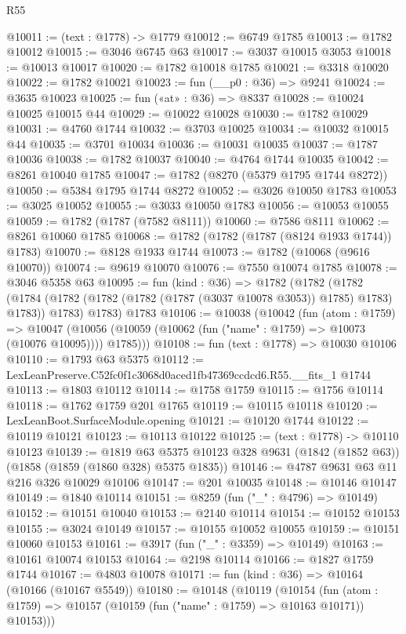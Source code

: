 \begin{lexlean}{R55}
\begin{coremodule}
@10011 := (text : @1778) -> @1779
@10012 := @6749 @1785
@10013 := @1782 @10012
@10015 := @3046 @6745 @63
@10017 := @3037 @10015 @3053
@10018 := @10013 @10017
@10020 := @1782 @10018 @1785
@10021 := @3318 @10020
@10022 := @1782 @10021
@10023 := fun (__p0 : @36) => @9241
@10024 := @3635 @10023
@10025 := fun («at» : @36) => @8337
@10028 := @10024 @10025 @10015 @44
@10029 := @10022 @10028
@10030 := @1782 @10029
@10031 := @4760 @1744
@10032 := @3703 @10025
@10034 := @10032 @10015 @44
@10035 := @3701 @10034
@10036 := @10031 @10035
@10037 := @1787 @10036
@10038 := @1782 @10037
@10040 := @4764 @1744 @10035
@10042 := @8261 @10040 @1785
@10047 := @1782 (@8270 (@5379 @1795 @1744 @8272))
@10050 := @5384 @1795 @1744 @8272
@10052 := @3026 @10050 @1783
@10053 := @3025 @10052
@10055 := @3033 @10050 @1783
@10056 := @10053 @10055
@10059 := @1782 (@1787 (@7582 @8111))
@10060 := @7586 @8111
@10062 := @8261 @10060 @1785
@10068 := @1782 (@1782 (@1787 (@8124 @1933 @1744)) @1783)
@10070 := @8128 @1933 @1744
@10073 := @1782 (@10068 (@9616 @10070))
@10074 := @9619 @10070
@10076 := @7550 @10074 @1785
@10078 := @3046 @5358 @63
@10095 := fun (kind : @36) =>
  @1782
    (@1782
      (@1782 (@1784 (@1782 (@1782 (@1782 (@1787 (@3037 @10078 @3053)) @1785) @1783) @1783)) @1783)
      @1783)
    @1783
@10106 := @10038
    (@10042
      (fun (atom : @1759) =>
      @10047 (@10056 (@10059 (@10062 (fun ("name" : @1759) => @10073 (@10076 @10095)))) @1785)))
@10108 := fun (text : @1778) => @10030 @10106
@10110 := @1793 @63 @5375
@10112 := LexLeanPreserve.C52fc0f1c3068d0aced1fb47369ccdcd6.R55.__fits_1 @1744
@10113 := @1803 @10112
@10114 := @1758 @1759
@10115 := @1756 @10114
@10118 := @1762 @1759 @201 @1765
@10119 := @10115 @10118
@10120 := LexLeanBoot.SurfaceModule.opening
@10121 := @10120 @1744
@10122 := @10119 @10121
@10123 := @10113 @10122
@10125 := (text : @1778) -> @10110 @10123
@10139 := @1819
    @63
    @5375
    @10123
    @328
    @9631
    (@1842 (@1852 @63))
    (@1858 (@1859 (@1860 @328) @5375 @1835))
@10146 := @4787 @9631 @63 @11 @216 @326 @10029 @10106
@10147 := @201 @10035
@10148 := @10146 @10147
@10149 := @1840 @10114
@10151 := @8259 (fun ("_" : @4796) => @10149)
@10152 := @10151 @10040
@10153 := @2140 @10114
@10154 := @10152 @10153
@10155 := @3024 @10149
@10157 := @10155 @10052 @10055
@10159 := @10151 @10060 @10153
@10161 := @3917 (fun ("_" : @3359) => @10149)
@10163 := @10161 @10074 @10153
@10164 := @2198 @10114
@10166 := @1827 @1759 @1744
@10167 := @4803 @10078
@10171 := fun (kind : @36) => @10164 (@10166 (@10167 @5549))
@10180 := @10148
    (@10119
      (@10154
        (fun (atom : @1759) => @10157 (@10159 (fun ("name" : @1759) => @10163 @10171)) @10153)))

\end{coremodule}
\end{lexlean}

